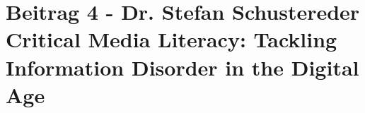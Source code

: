 \section*{Beitrag 4 - Dr. Stefan Schustereder
Critical Media Literacy: Tackling Information Disorder in the Digital Age}